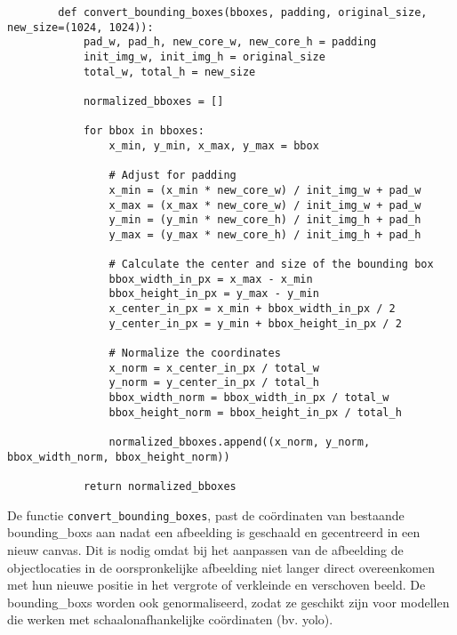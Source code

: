\begin{listing}[H]
    \begin{verbatim}
        def convert_bounding_boxes(bboxes, padding, original_size, new_size=(1024, 1024)):
            pad_w, pad_h, new_core_w, new_core_h = padding
            init_img_w, init_img_h = original_size
            total_w, total_h = new_size
            
            normalized_bboxes = []
            
            for bbox in bboxes:
                x_min, y_min, x_max, y_max = bbox
                
                # Adjust for padding
                x_min = (x_min * new_core_w) / init_img_w + pad_w
                x_max = (x_max * new_core_w) / init_img_w + pad_w
                y_min = (y_min * new_core_h) / init_img_h + pad_h
                y_max = (y_max * new_core_h) / init_img_h + pad_h
                
                # Calculate the center and size of the bounding box
                bbox_width_in_px = x_max - x_min
                bbox_height_in_px = y_max - y_min
                x_center_in_px = x_min + bbox_width_in_px / 2
                y_center_in_px = y_min + bbox_height_in_px / 2
                
                # Normalize the coordinates
                x_norm = x_center_in_px / total_w
                y_norm = y_center_in_px / total_h
                bbox_width_norm = bbox_width_in_px / total_w
                bbox_height_norm = bbox_height_in_px / total_h
                
                normalized_bboxes.append((x_norm, y_norm, bbox_width_norm, bbox_height_norm))
            
            return normalized_bboxes
    \end{verbatim}
    \caption[Functie \texttt{convert\_bounding\_boxes}]{Functie die ervoor zorgt dat de \glspl{bounding_box} herberekend worden nadat de afbeelding herschaald is door \texttt{resize\_image}.}
\end{listing}

De functie \texttt{convert\_bounding\_boxes}, past de coördinaten van bestaande \glspl{bounding_box} aan nadat een afbeelding is geschaald en gecentreerd in een nieuw canvas. Dit is nodig omdat bij het aanpassen van de afbeelding de objectlocaties in de oorspronkelijke afbeelding niet langer direct overeenkomen met hun nieuwe positie in het vergrote of verkleinde en verschoven beeld. De \glspl{bounding_box} worden ook genormaliseerd, zodat ze geschikt zijn voor modellen die werken met schaalonafhankelijke coördinaten (bv. \gls{yolo}). \\

